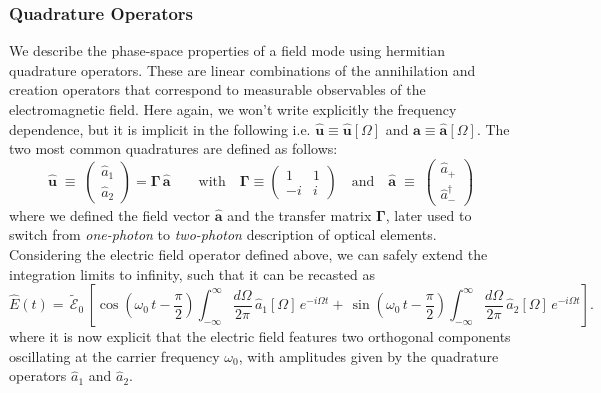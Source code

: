 \subsubsection{Quadrature Operators}
We describe the phase-space properties of a field mode using hermitian quadrature operators. These are linear combinations of the annihilation and creation operators that correspond to measurable observables of the electromagnetic field. Here again, we won't write explicitly the frequency dependence, but it is implicit in the following i.e. $\mathbf{\hat{u}} \equiv \mathbf{\hat{u}}[\Omega] $ and $\mathbf{\hat{a}} \equiv \mathbf{\hat{a}}[\Omega] $.
The two most common quadratures are defined as follows:
\begin{equation}
\mathbf{\hat{u}}\;\equiv\;
\begin{pmatrix}\hat a_1\\[2pt]\hat a_2\end{pmatrix}
=\mathbf\Gamma \, \mathbf{\hat{a}}  \label{II.2}
\qquad \text{with} \quad
\mathbf \Gamma \equiv
\begin{pmatrix}
1 & 1 \\
-i & i
\end{pmatrix}
\quad
\text{and} \quad
\mathbf{\hat{a}}\;\equiv\;
\begin{pmatrix}\hat a_+\\ \hat a_-^\dagger\end{pmatrix}
\end{equation}
where we defined the field vector $\mathbf{\hat{a}}$ and the transfer matrix $\mathbf \Gamma$, later used to switch from \textit{one-photon} to \textit{two-photon} description of optical elements. Considering the electric field operator defined above, we can safely extend the integration limits to infinity, such that it can be recasted as 
\begin{equation}
\hat{E}(t) = \, \tilde{\mathcal{E}}_0 \,\left[ \cos ( \omega_0 \, t - \frac{\pi}{2} ) \int_  {-\infty}^{\infty} \dfrac{d\Omega}{2\pi}  \,\hat a_1[\Omega] \,e^{-i\Omega t} + \, \sin ( \omega_0 \, t - \frac{\pi}{2} )  \int_ {-\infty}^{\infty} \dfrac{d\Omega}{2\pi}  \,\hat a_2[\Omega] \,e^{-i\Omega t} \right].
\end{equation}
where it is now explicit that the electric field features two orthogonal components oscillating at the carrier frequency $\omega_0$, with amplitudes given by the quadrature operators $\hat a_1$ and $\hat a_2$.\\

